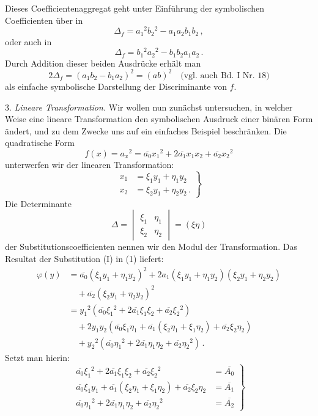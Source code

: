 \documentclass[11pt]{article}
\providecommand{\weberpage}[1]{}
\providecommand{\weq}[2]{\begin{equation}\tag{#1}#2\end{equation}}
\let\Delta\varDelta
\begin{document}
\weberpage{3}
Dieses Coefficientenaggregat geht unter Einführung der symbolischen Coefficienten über in
\[
\Delta_f = a_1{}^2b_2{}^2 - a_1a_2b_1b_2\,,
\]
oder auch in
\[
\Delta_f = b_1{}^2a_2{}^2 - b_1b_2a_1a_2\,.
\]
Durch Addition dieser beiden Ausdrücke erhält man
\[
2\Delta_f = (a_1b_2 - b_1a_2)^2 = (ab)^2 \quad \text{(vgl. auch Bd. I Nr. 18)}
\]
als einfache symbolische Darstellung der Discriminante von $f$.

3. \textit{Lineare Transformation.} Wir wollen nun zunächst untersuchen, in welcher Weise eine lineare Transformation den symbolischen Ausdruck einer binären Form ändert, und zu dem Zwecke uns auf ein einfaches Beispiel beschränken. Die quadratische Form
\weq{1}{f(x) = a_x{}^2 = \overline{a_0}x_1{}^2 + 2\overline{a_1}x_1x_2 + \overline{a_2}x_2{}^2}
unterwerfen wir der linearen Transformation:
\weq{I}{\left.\begin{aligned}
x_1 &= \xi_1y_1 + \eta_1y_2 \\
x_2 &= \xi_2y_1 + \eta_2y_2\,.
\end{aligned}\right\}}
Die Determinante
\[
\Delta = \begin{vmatrix} \xi_1 & \eta_1 \\ \xi_2 & \eta_2 \end{vmatrix} = (\xi\eta)
\]
der Substitutionscoefficienten nennen wir den \glqq Modul\grqq{} der Transformation. Das Resultat der Substitution (I) in (1) liefert:
\[
\begin{aligned}
\varphi(y) &= \overline{a_0}(\xi_1y_1+\eta_1y_2)^2 + 2a_1(\xi_1y_1+\eta_1y_2)(\xi_2y_1+\eta_2y_2) %
\\
&\quad + \overline{a_2}(\xi_2y_1+\eta_2y_2)^2 \\
&= y_1{}^2(\overline{a_0}\xi_1{}^2 + 2\overline{a_1}\xi_1\xi_2 + \overline{a_2}\xi_2{}^2) \\
&\quad + 2y_1y_2(\overline{a_0}\xi_1\eta_1 + \overline{a_1}(\xi_2\eta_1+\xi_1\eta_2) + \overline{a_2}\xi_2\eta_2) \\
&\quad + y_2{}^2(\overline{a_0}\eta_1{}^2 + 2\overline{a_1}\eta_1\eta_2 + \overline{a_2}\eta_2{}^2)\,.
\end{aligned}
\]
Setzt man hierin:
\weq{II}{\left.\begin{aligned}
\overline{a_0}\xi_1{}^2 + 2\overline{a_1}\xi_1\xi_2 + \overline{a_2}\xi_2{}^2 &= \overline{A_0} \\
\overline{a_0}\xi_1y_1 + \overline{a_1}(\xi_2\eta_1+\xi_1\eta_2) + \overline{a_2}\xi_2\eta_2 &= \overline{A_1} %
\\
\overline{a_0}\eta_1{}^2 + 2\overline{a_1}\eta_1\eta_2 + \overline{a_2}\eta_2{}^2 &= \overline{A_2}
\end{aligned}\right\}}
\end{document}
